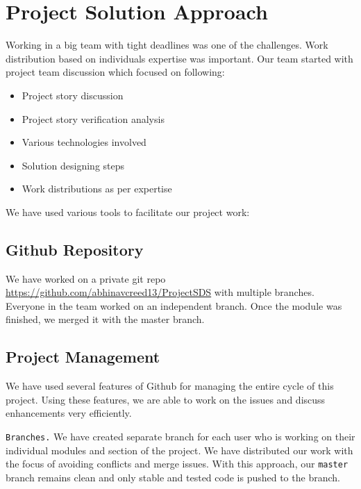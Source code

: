 \section{Project Solution Approach}
Working in a big team with tight deadlines was one of the challenges. Work distribution based on individuals expertise was important. Our team started with project team discussion which focused on following:

\begin{itemize}
	\item Project story discussion
	\item Project story verification analysis
	\item Various technologies involved
	\item Solution designing steps
	\item Work distributions as per expertise
\end{itemize}

\par
\noindent We have used various tools to facilitate our project work:

\subsection{Github Repository}
We have worked on a private git repo \url{https://github.com/abhinavcreed13/ProjectSDS} with multiple branches. Everyone in the team worked on an independent branch. Once the module was finished, we merged it with the master branch.  

\subsection{Project Management}
We have used several features of Github for managing the entire cycle of this project. Using these features, we are able to work on the issues and discuss enhancements very efficiently.

\texttt{Branches.} We have created separate branch for each user who is working on their individual modules and section of the project. We have distributed our work with the focus of avoiding conflicts and merge issues. With this approach, our \texttt{master} branch remains clean and only stable and tested code is pushed to the branch.


